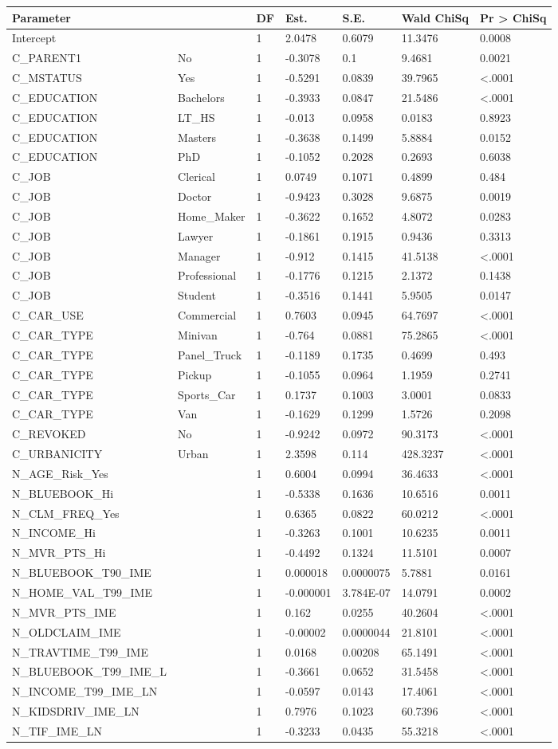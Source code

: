 \documentclass[]{article}
\begin{document}
\begin{longtable}[]{@{}lllllll@{}}
\toprule
Parameter & & DF & Est. & S.E. & Wald ChiSq & Pr \textgreater{}
ChiSq\tabularnewline
\midrule
\endhead
Intercept & & 1 & 2.0478 & 0.6079 & 11.3476 & 0.0008\tabularnewline
C\_PARENT1 & No & 1 & -0.3078 & 0.1 & 9.4681 & 0.0021\tabularnewline
C\_MSTATUS & Yes & 1 & -0.5291 & 0.0839 & 39.7965 &
\textless{}.0001\tabularnewline
C\_EDUCATION & Bachelors & 1 & -0.3933 & 0.0847 & 21.5486 &
\textless{}.0001\tabularnewline
C\_EDUCATION & LT\_HS & 1 & -0.013 & 0.0958 & 0.0183 &
0.8923\tabularnewline
C\_EDUCATION & Masters & 1 & -0.3638 & 0.1499 & 5.8884 &
0.0152\tabularnewline
C\_EDUCATION & PhD & 1 & -0.1052 & 0.2028 & 0.2693 &
0.6038\tabularnewline
C\_JOB & Clerical & 1 & 0.0749 & 0.1071 & 0.4899 & 0.484\tabularnewline
C\_JOB & Doctor & 1 & -0.9423 & 0.3028 & 9.6875 & 0.0019\tabularnewline
C\_JOB & Home\_Maker & 1 & -0.3622 & 0.1652 & 4.8072 &
0.0283\tabularnewline
C\_JOB & Lawyer & 1 & -0.1861 & 0.1915 & 0.9436 & 0.3313\tabularnewline
C\_JOB & Manager & 1 & -0.912 & 0.1415 & 41.5138 &
\textless{}.0001\tabularnewline
C\_JOB & Professional & 1 & -0.1776 & 0.1215 & 2.1372 &
0.1438\tabularnewline
C\_JOB & Student & 1 & -0.3516 & 0.1441 & 5.9505 & 0.0147\tabularnewline
C\_CAR\_USE & Commercial & 1 & 0.7603 & 0.0945 & 64.7697 &
\textless{}.0001\tabularnewline
C\_CAR\_TYPE & Minivan & 1 & -0.764 & 0.0881 & 75.2865 &
\textless{}.0001\tabularnewline
C\_CAR\_TYPE & Panel\_Truck & 1 & -0.1189 & 0.1735 & 0.4699 &
0.493\tabularnewline
C\_CAR\_TYPE & Pickup & 1 & -0.1055 & 0.0964 & 1.1959 &
0.2741\tabularnewline
C\_CAR\_TYPE & Sports\_Car & 1 & 0.1737 & 0.1003 & 3.0001 &
0.0833\tabularnewline
C\_CAR\_TYPE & Van & 1 & -0.1629 & 0.1299 & 1.5726 &
0.2098\tabularnewline
C\_REVOKED & No & 1 & -0.9242 & 0.0972 & 90.3173 &
\textless{}.0001\tabularnewline
C\_URBANICITY & Urban & 1 & 2.3598 & 0.114 & 428.3237 &
\textless{}.0001\tabularnewline
N\_AGE\_Risk\_Yes & & 1 & 0.6004 & 0.0994 & 36.4633 &
\textless{}.0001\tabularnewline
N\_BLUEBOOK\_Hi & & 1 & -0.5338 & 0.1636 & 10.6516 &
0.0011\tabularnewline
N\_CLM\_FREQ\_Yes & & 1 & 0.6365 & 0.0822 & 60.0212 &
\textless{}.0001\tabularnewline
N\_INCOME\_Hi & & 1 & -0.3263 & 0.1001 & 10.6235 & 0.0011\tabularnewline
N\_MVR\_PTS\_Hi & & 1 & -0.4492 & 0.1324 & 11.5101 &
0.0007\tabularnewline
N\_BLUEBOOK\_T90\_IME & & 1 & 0.000018 & 0.0000075 & 5.7881 &
0.0161\tabularnewline
N\_HOME\_VAL\_T99\_IME & & 1 & -0.000001 & 3.784E-07 & 14.0791 &
0.0002\tabularnewline
N\_MVR\_PTS\_IME & & 1 & 0.162 & 0.0255 & 40.2604 &
\textless{}.0001\tabularnewline
N\_OLDCLAIM\_IME & & 1 & -0.00002 & 0.0000044 & 21.8101 &
\textless{}.0001\tabularnewline
N\_TRAVTIME\_T99\_IME & & 1 & 0.0168 & 0.00208 & 65.1491 &
\textless{}.0001\tabularnewline
N\_BLUEBOOK\_T99\_IME\_L & & 1 & -0.3661 & 0.0652 & 31.5458 &
\textless{}.0001\tabularnewline
N\_INCOME\_T99\_IME\_LN & & 1 & -0.0597 & 0.0143 & 17.4061 &
\textless{}.0001\tabularnewline
N\_KIDSDRIV\_IME\_LN & & 1 & 0.7976 & 0.1023 & 60.7396 &
\textless{}.0001\tabularnewline
N\_TIF\_IME\_LN & & 1 & -0.3233 & 0.0435 & 55.3218 &
\textless{}.0001\tabularnewline
\bottomrule
\end{longtable}
\end{document}
